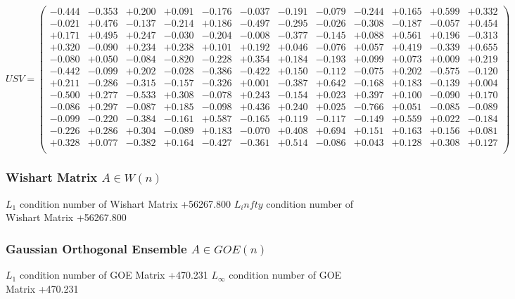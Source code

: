 \documentclass[9pt]{article}
\theoremstyle{plain}
\theoremstyle{definition}
\theoremstyle{remark}
\numberwithin{equation}{section}
\begin{document}
$U S V = \left(
\begin{array}{
cccccccccccc}
-0.444 & -0.353 & +0.200 & +0.091 & -0.176 & -0.037 & -0.191 & -0.079 & -0.244 & +0.165 & +0.599 & +0.332 \\
-0.021 & +0.476 & -0.137 & -0.214 & +0.186 & -0.497 & -0.295 & -0.026 & -0.308 & -0.187 & -0.057 & +0.454 \\
+0.171 & +0.495 & +0.247 & -0.030 & -0.204 & -0.008 & -0.377 & -0.145 & +0.088 & +0.561 & +0.196 & -0.313 \\
+0.320 & -0.090 & +0.234 & +0.238 & +0.101 & +0.192 & +0.046 & -0.076 & +0.057 & +0.419 & -0.339 & +0.655 \\
-0.080 & +0.050 & -0.084 & -0.820 & -0.228 & +0.354 & +0.184 & -0.193 & +0.099 & +0.073 & +0.009 & +0.219 \\
-0.442 & -0.099 & +0.202 & -0.028 & -0.386 & -0.422 & +0.150 & -0.112 & -0.075 & +0.202 & -0.575 & -0.120 \\
+0.211 & -0.286 & -0.315 & -0.157 & -0.326 & +0.001 & -0.387 & +0.642 & -0.168 & +0.183 & -0.139 & +0.004 \\
-0.500 & +0.277 & -0.533 & +0.308 & -0.078 & +0.243 & -0.154 & +0.023 & +0.397 & +0.100 & -0.090 & +0.170 \\
-0.086 & +0.297 & -0.087 & +0.185 & -0.098 & +0.436 & +0.240 & +0.025 & -0.766 & +0.051 & -0.085 & -0.089 \\
-0.099 & -0.220 & -0.384 & -0.161 & +0.587 & -0.165 & +0.119 & -0.117 & -0.149 & +0.559 & +0.022 & -0.184 \\
-0.226 & +0.286 & +0.304 & -0.089 & +0.183 & -0.070 & +0.408 & +0.694 & +0.151 & +0.163 & +0.156 & +0.081 \\
+0.328 & +0.077 & -0.382 & +0.164 & -0.427 & -0.361 & +0.514 & -0.086 & +0.043 & +0.128 & +0.308 & +0.127 \\
\end{array}
\right)$ \newline 

\subsubsection{Wishart Matrix $A \in W(n)$}
$L_1$ condition number of Wishart Matrix +56267.800
$L_infty$ condition number of Wishart Matrix +56267.800
\subsubsection{Gaussian Orthogonal Ensemble $A \in GOE(n)$}
$L_1$ condition number of GOE Matrix +470.231
$L_\infty$ condition number of GOE Matrix +470.231
\end{document}
